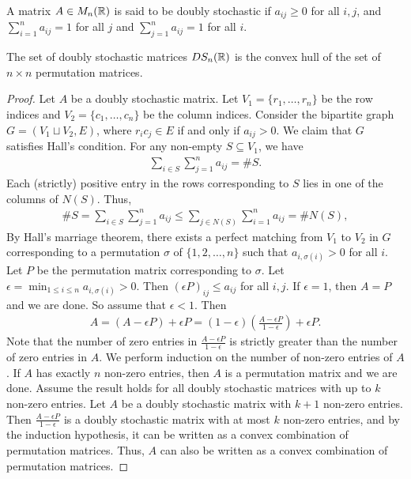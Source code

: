 \begin{definition}
    A matrix $A \in M_{n}(\mathbb{R})$ is said to be doubly stochastic if $a_{ij} \geq 0$ for all $i,j$, and $\sum_{i=1}^{n} a_{ij} = 1$ for all $j$ and $\sum_{j=1}^{n} a_{ij} = 1$ for all $i$.
\end{definition}

\begin{theorem}
    The set of doubly stochastic matrices $DS_{n}(\mathbb{R})$ is the convex hull of the set of $n \times n$ permutation matrices.
\end{theorem}
\begin{proof}
    Let $A$ be a doubly stochastic matrix. Let $V_{1} = \{r_{1},\ldots,r_{n}\}$ be the row indices and $V_{2} = \{c_{1},\ldots,c_{n}\}$ be the column indices. Consider the bipartite graph $G = (V_{1} \sqcup V_{2}, E)$, where $r_{i}c_{j} \in E$ if and only if $a_{ij} > 0$. We claim that $G$ satisfies Hall's condition. For any non-empty $S \subseteq V_{1}$, we have
    \begin{align}
        \sum_{i \in S} \sum_{j=1}^{n} a_{ij} = \#S.
    \end{align}
    Each (strictly) positive entry in the rows corresponding to $S$ lies in one of the columns of $N(S)$. Thus,
    \begin{align}
        \# S = \sum_{i \in S} \sum_{j=1}^{n} a_{ij} \leq \sum_{j \in N(S)} \sum_{i=1}^{n} a_{ij} = \# N(S),
    \end{align}
    By Hall's marriage theorem, there exists a perfect matching from $V_{1}$ to $V_{2}$ in $G$ corresponding to a permutation $\sigma$ of $\{1,2,\ldots,n\}$ such that $a_{i,\sigma(i)} > 0$ for all $i$. Let $P$ be the permutation matrix corresponding to $\sigma$. Let $\epsilon = \min_{1 \leq i \leq n} a_{i,\sigma(i)} > 0$. Then $(\epsilon P)_{ij} \leq a_{ij}$ for all $i,j$. If $\epsilon = 1$, then $A = P$ and we are done. So assume that $\epsilon < 1$. Then
    \begin{align}
        A = (A-\epsilon P) + \epsilon P = (1-\epsilon)\left(\frac{A-\epsilon P}{1-\epsilon}\right) + \epsilon P.
    \end{align}
    Note that the number of zero entries in $\frac{A-\epsilon P}{1-\epsilon}$ is strictly greater than the number of zero entries in $A$. We perform induction on the number of non-zero entries of $A$. If $A$ has exactly $n$ non-zero entries, then $A$ is a permutation matrix and we are done. Assume the result holds for all doubly stochastic matrices with up to $k$ non-zero entries. Let $A$ be a doubly stochastic matrix with $k+1$ non-zero entries. Then $\frac{A-\epsilon P}{1-\epsilon}$ is a doubly stochastic matrix with at most $k$ non-zero entries, and by the induction hypothesis, it can be written as a convex combination of permutation matrices. Thus, $A$ can also be written as a convex combination of permutation matrices.
\end{proof}

